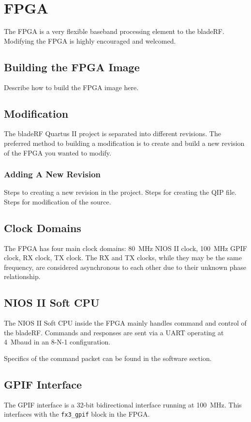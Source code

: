 \section{FPGA} \label{sec:fpga}

The FPGA is a very flexible baseband processing element to the bladeRF.
Modifying the FPGA is highly encouraged and welcomed.

\subsection{Building the FPGA Image} \label{sec:fpga-building}
Describe how to build the FPGA image here.

\subsection{Modification} \label{sec:fpga-mods}
The bladeRF Quartus II project is separated into different revisions.  The
preferred method to building a modification is to create and build a new
revision of the FPGA you wanted to modify.

\subsubsection{Adding A New Revision} \label{sec:fgpa-newrev}
Steps to creating a new revision in the project.
Steps for creating the QIP file.
Steps for modification of the source.

\subsection{Clock Domains} \label{sec:fpga-clocks}
The FPGA has four main clock domains: 80~MHz NIOS II clock, 100~MHz GPIF clock,
RX clock, TX clock.  The RX and TX clocks, while they may be the same
frequency, are considered asynchronous to each other due to their unknown
phase relationship.

\subsection{NIOS II Soft CPU} \label{sec:fpga-nios}
The NIOS II Soft CPU inside the FPGA mainly handles command and control of the
bladeRF.  Commands and responses are sent via a UART operating at 4~Mbaud in
an 8-N-1 configuration.

Specifics of the command packet can be found in the software section.

\subsection{GPIF Interface} \label{sec:fpga-gpif}
The GPIF interface is a 32-bit bidirectional interface running at 100~MHz.
This interfaces with the \texttt{fx3\_gpif} block in the FPGA.

